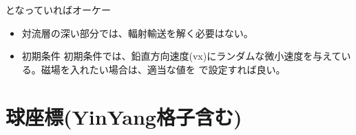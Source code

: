 \documentclass[letterpaper,10pt,dvipdfmx,report]{sphinxmanual}
\begin{document}
\sphinxAtStartPar
となっていればオーケー
\begin{itemize}
\item {} \begin{description}
\sphinxAtStartPar
対流層の深い部分では、輻射輸送を解く必要はない。

\end{description}

\item {} 
\sphinxAtStartPar
初期条件
初期条件では、鉛直方向速度(vx)にランダムな微小速度を与えている。磁場を入れたい場合は、適当な値を  で設定すれば良い。

\end{itemize}


\section{球座標(Yin\sphinxhyphen{}Yang格子含む)}
\label{\detokenize{typical_case:yin-yang}}
\end{document}

